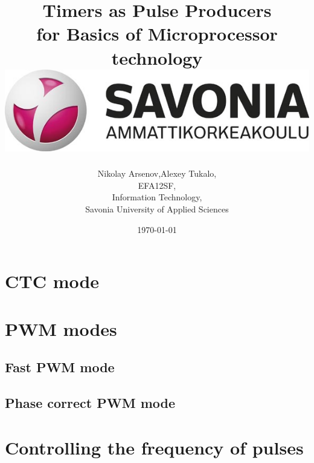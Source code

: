 \documentclass[english]{article}
\date{}
\begin{document}
\title{\vspace{2in}Timers as Pulse Producers\\
\small for Basics of Microprocessor technology\\
\vspace{0.5in}\includegraphics{savonia.jpg}}

\nopagebreak
\maketitle


\vspace{3in}

\author{
\begin{flushright}
Nikolay Arsenov,Alexey Tukalo,\\
EFA12SF,\\
Information Technology,\\
Savonia University of Applied Sciences
\end{flushright}
}

\date{\today}
\thispagestyle{empty}

\newpage
\setcounter{page}{1}
\setcounter{tocdepth}{2}
\tableofcontents

\newpage

\section{CTC mode}

\section{PWM modes}
\subsection{Fast PWM mode}
\subsection{Phase correct PWM mode}

\section{Controlling the frequency of pulses}
\end{document}

